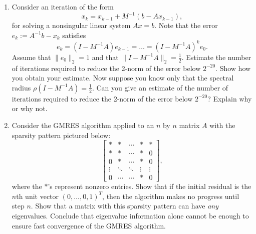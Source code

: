 \documentclass[10pt]{article}
\begin{document}
\begin{problem}[Problem 3]
\begin{enumerate}[label=(\alph*)]
\item
Consider an iteration of the form 
\[
x_k = x_{k-1} + M^{-1} ( b - A x_{k-1} ) ,
\]
for solving a nonsingular linear system \( Ax=b \).  Note that the error \( e_k := A^{-1} b - x_k \)
satisfies
\[
e_k = (I - M^{-1} A) e_{k-1} = \ldots = (I - M^{-1} A)^k e_0.
\]
Assume that \( \| e_0 \|_2 = 1 \) and that \( \| I - M^{-1} A \|_2 = \frac{1}{2} \). Estimate the number of iterations required to reduce the 2-norm of the error below \( 2^{-20} \). Show how you obtain your estimate.  Now suppose you know only that the spectral radius \( \rho ( I - M^{-1} A ) = \frac{1}{2} \).  Can you give an estimate of the number of iterations required to reduce the 2-norm of the error below \( 2^{-20} \)?  Explain why or why not.

    
\item Consider the GMRES algorithm applied to an \( n \) by \( n \) matrix \( A \) with the sparsity pattern pictured below:
\[
\left[ \begin{array}{ccccc}
\ast & \ast & \cdots & \ast & \ast \\
\ast & \ast & \cdots & \ast & 0 \\
0    & \ast & \cdots & \ast & 0 \\
\vdots  & \ddots & \ddots & \vdots & \vdots \\
0    & \cdots    & \cdots & \ast & 0 \end{array} \right] ,
\]
where the \( \ast \)'s represent nonzero entries.  Show that if the initial residual is the 
\( n \)th unit vector \( ( 0, \ldots , 0 , 1 )^T \), then the algorithm makes no progress until step \( n \).  Show that a matrix with this sparsity pattern can have {\em any} eigenvalues.  Conclude that eigenvalue information alone cannot be enough to ensure fast convergence of the GMRES algorithm.
\end{enumerate}
\end{problem}
\end{document}
